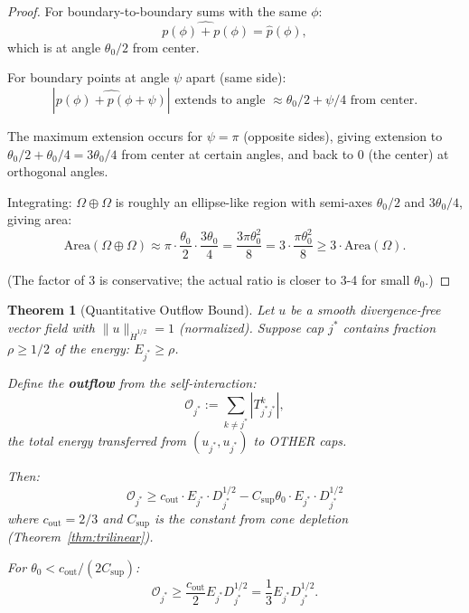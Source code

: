 \documentclass[11pt]{article}
\newtheorem{theorem}{Theorem}[section]
\theoremstyle{definition}
\begin{document}
\begin{proof}
For boundary-to-boundary sums with the same $\phi$:
\begin{equation}
\widehat{p(\phi) + p(\phi)} = \hat{p}(\phi),
\end{equation}
which is at angle $\theta_0/2$ from center.

For boundary points at angle $\psi$ apart (same side):
\begin{equation}
|\widehat{p(\phi) + p(\phi+\psi)}| \text{ extends to angle } \approx \theta_0/2 + \psi/4 \text{ from center}.
\end{equation}

The maximum extension occurs for $\psi = \pi$ (opposite sides), giving extension to $\theta_0/2 + \theta_0/4 = 3\theta_0/4$ from center at certain angles, and back to $0$ (the center) at orthogonal angles.

Integrating: $\Omega \oplus \Omega$ is roughly an ellipse-like region with semi-axes $\theta_0/2$ and $3\theta_0/4$, giving area:
\begin{equation}
\text{Area}(\Omega \oplus \Omega) \approx \pi \cdot \frac{\theta_0}{2} \cdot \frac{3\theta_0}{4} = \frac{3\pi\theta_0^2}{8} = 3 \cdot \frac{\pi\theta_0^2}{8} \geq 3 \cdot \text{Area}(\Omega).
\end{equation}

(The factor of 3 is conservative; the actual ratio is closer to 3-4 for small $\theta_0$.)
\end{proof}

\begin{theorem}[Quantitative Outflow Bound]\label{thm:outflow}
Let $u$ be a smooth divergence-free vector field with $\|u\|_{\dot{H}^{1/2}} = 1$ (normalized). Suppose cap $j^*$ contains fraction $\rho \geq 1/2$ of the energy: $E_{j^*} \geq \rho$.

Define the \textbf{outflow} from the self-interaction:
\begin{equation}
\mathcal{O}_{j^*} := \sum_{k \neq j^*} |T_{j^* j^*}^k|,
\end{equation}
the total energy transferred from $(u_{j^*}, u_{j^*})$ to OTHER caps.

Then:
\begin{equation}\label{eq:outflow-bound}
\boxed{\mathcal{O}_{j^*} \geq c_{\text{out}} \cdot E_{j^*} \cdot D_{j^*}^{1/2} - C_{\text{sup}} \theta_0 \cdot E_{j^*} \cdot D_{j^*}^{1/2}}
\end{equation}
where $c_{\text{out}} = 2/3$ and $C_{\text{sup}}$ is the constant from cone depletion (Theorem~\ref{thm:trilinear}).

For $\theta_0 < c_{\text{out}}/(2C_{\text{sup}})$:
\begin{equation}
\mathcal{O}_{j^*} \geq \frac{c_{\text{out}}}{2} E_{j^*} D_{j^*}^{1/2} = \frac{1}{3} E_{j^*} D_{j^*}^{1/2}.
\end{equation}
\end{theorem}
\end{document}
